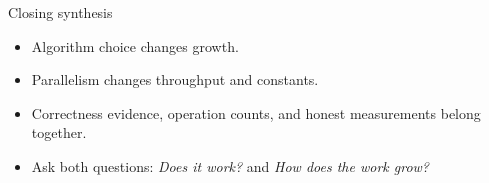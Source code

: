 \documentclass[aspectratio=169]{beamer}
\begin{document}
\begin{frame}{Closing synthesis}
  \begin{itemize}
    \item Algorithm choice changes growth.
    \item Parallelism changes throughput and constants.
    \item Correctness evidence, operation counts, and honest measurements belong together.
    \item Ask both questions: \emph{Does it work?} and \emph{How does the work grow?}
  \end{itemize}
\end{frame}
\end{document}
